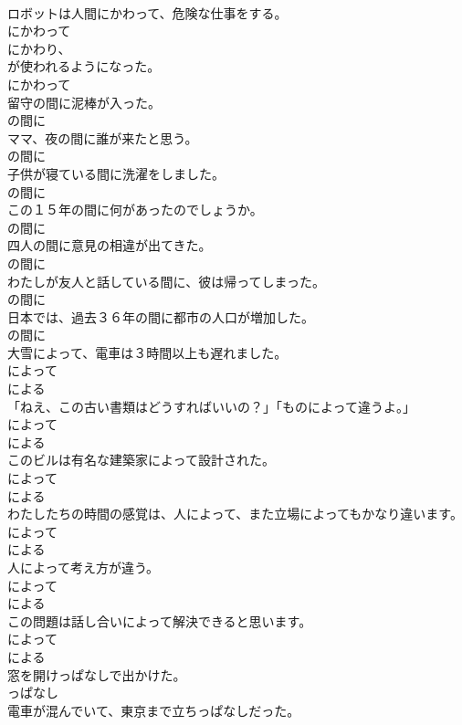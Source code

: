 \documentclass[8pt]{extreport}
\begin{document}
\begin{CJK}{UTF8}{min}
\\	ロボットは人間にかわって、危険な仕事をする。	
\\	にかわって
\\	にかわり、
\\	が使われるようになった。	
\\	にかわって
\\	留守の間に泥棒が入った。	
\\	の間に
\\	ママ、夜の間に誰が来たと思う。	
\\	の間に
\\	子供が寝ている間に洗濯をしました。	
\\	の間に
\\	この１５年の間に何があったのでしょうか。	
\\	の間に
\\	四人の間に意見の相違が出てきた。	
\\	の間に
\\	わたしが友人と話している間に、彼は帰ってしまった。	
\\	の間に
\\	日本では、過去３６年の間に都市の人口が増加した。	
\\	の間に
\\	大雪によって、電車は３時間以上も遅れました。	
\\	によって 
\\	による
\\	「ねえ、この古い書類はどうすればいいの？」「ものによって違うよ。」	
\\	によって 
\\	による
\\	このビルは有名な建築家によって設計された。	
\\	によって 
\\	による
\\	わたしたちの時間の感覚は、人によって、また立場によってもかなり違います。	
\\	によって 
\\	による
\\	人によって考え方が違う。	
\\	によって 
\\	による
\\	この問題は話し合いによって解決できると思います。	
\\	によって 
\\	による
\\	窓を開けっぱなしで出かけた。	
\\	っぱなし
\\	電車が混んでいて、東京まで立ちっぱなしだった。	

\end{CJK}
\end{document}
